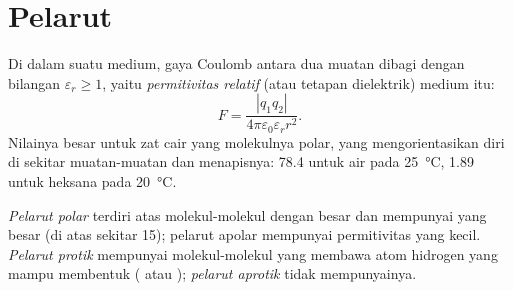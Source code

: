 \section{Pelarut}

\begin{definition}\label{def:b1:intermolecular-forces-solvents:permittivity}
Di dalam suatu medium, gaya Coulomb antara dua muatan dibagi dengan
bilangan $\varepsilon_r \ge 1$, yaitu \emph{permitivitas
relatif} (atau tetapan dielektrik) medium
itu:
\[
  F = \frac{|q_1 q_2|}{4\pi\varepsilon_0\varepsilon_r r^2} .
\]
Nilainya besar untuk zat cair yang molekulnya polar, yang mengorientasikan
diri di sekitar muatan-muatan dan menapisnya: \num{78.4} untuk air pada
\qty{25}{\celsius}, \num{1.89} untuk heksana pada \qty{20}{\celsius}.
\end{definition}

\begin{definition}\label{def:b1:intermolecular-forces-solvents:solvent-classes}
\emph{Pelarut polar} terdiri atas molekul-molekul
dengan  besar dan mempunyai  yang besar
(di atas sekitar 15); pelarut apolar mempunyai permitivitas yang kecil.
\emph{Pelarut protik} mempunyai molekul-molekul
yang membawa atom hidrogen yang mampu membentuk 
( atau ); \emph{pelarut aprotik}
tidak mempunyainya.
\end{definition}

